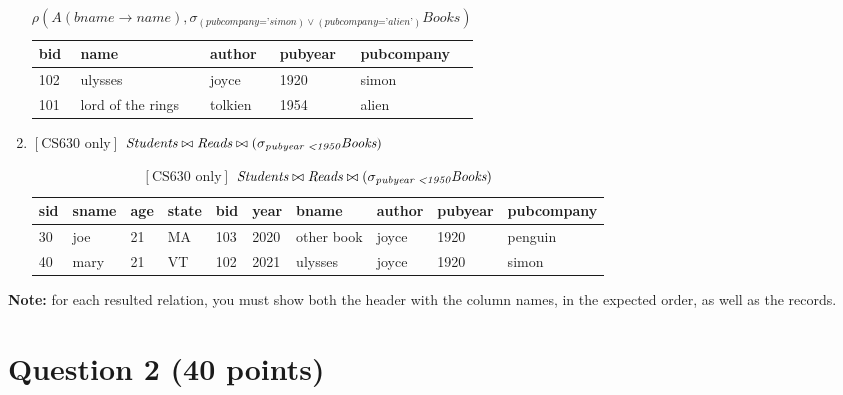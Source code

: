 \documentclass[letterpaper, 11pt]{article}
\begin{document}
\begin{enumerate}[label={\alph*})]
    \begin{table}[H]
        \centering
        \caption*{$\rho(A(\textit{bname} \to \textit{name}), \sigma_{(\textit{pubcompany='simon})\vee (\textit{pubcompany='alien'})} \textit{Books})$}
        \begin{tabular}{|l|l|l|l|l|}
        \hline
            \cellcolor[HTML]{b4c6e7} bid & \cellcolor[HTML]{b4c6e7} name & \cellcolor[HTML]{b4c6e7} author & \cellcolor[HTML]{b4c6e7} pubyear & \cellcolor[HTML]{b4c6e7} pubcompany \\
            \hline
            102 & ulysses & joyce & 1920 & simon \\
            \hline
            101 & lord of the rings & tolkien & 1954 & alien \\
            \hline
        \end{tabular}
    \end{table}
    \item $\left[\text{CS630 only}\right]$ $\textit{Students} \bowtie \textit{Reads} \bowtie (\sigma_{\textit{pubyear \textless 1950}}\textit{Books})$
    \begin{table}[H]
        \centering
        \caption*{$\left[\text{CS630 only}\right]$ $\textit{Students} \bowtie \textit{Reads} \bowtie (\sigma_{\textit{pubyear \textless 1950}}\textit{Books})$}
        \begin{tabular}{|l|l|l|l|l|l|l|l|l|l|}
            \hline
            \cellcolor[HTML]{b4c6e7} sid & \cellcolor[HTML]{b4c6e7} sname & \cellcolor[HTML]{b4c6e7} age & \cellcolor[HTML]{b4c6e7} state & \cellcolor[HTML]{b4c6e7} bid & \cellcolor[HTML]{b4c6e7} year & \cellcolor[HTML]{b4c6e7} bname & \cellcolor[HTML]{b4c6e7} author & \cellcolor[HTML]{b4c6e7} pubyear & \cellcolor[HTML]{b4c6e7} pubcompany \\
            \hline
            30 & joe & 21 & MA & 103 & 2020 & other book & joyce & 1920 & penguin \\
            \hline
            40 & mary & 21 & VT & 102 & 2021 & ulysses & joyce & 1920 & simon \\
            \hline
        \end{tabular}
    \end{table}
\end{enumerate}

\textbf{Note:} for each resulted relation, you must show both the header with the column names, in the expected order, as well as the records.

\section*{Question 2 (40 points)}
\end{document}
